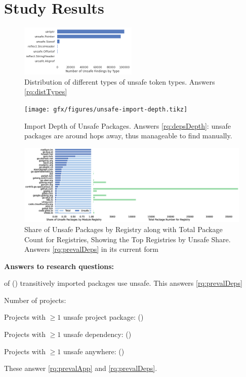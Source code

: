 \section{Study Results}
\label{sec:eval}

\begin{figure}[ht]
    \centering
    \includegraphics[width=0.5\textwidth]{gfx/figures/distribution-unsafe-types.png}
    \caption{Distribution of different types of unsafe token types. Answers \ref{rq:distTypes}}
    \label{fig:unsafe-tokens-distribution}
\end{figure}

\begin{figure}[ht]
    \centering
    {\scriptsize \texttt{[image: gfx/figures/unsafe-import-depth.tikz]}}
    \caption{Import Depth of Unsafe Packages. Answers \ref{rq:depsDepth}: unsafe packages are around  hops away, thus manageable to find manually. }
    \label{fig:unsafe-import-depth}
\end{figure}

\begin{figure}[ht]
    \centering
    \includegraphics[width=\textwidth]{gfx/figures/unsafe-packages-by-registry-n30.eps}
    \caption{Share of Unsafe Packages by Registry along with Total Package Count for Registries, Showing the Top  Registries by Unsafe Share. Answers \ref{rq:prevalDeps} in its current form}
    \label{fig:unsafe-by-registry}
\end{figure}







\textbf{Answers to research questions:}

 of  () transitively imported packages use unsafe. This answers \ref{rq:prevalDeps}

Number of projects: 

Projects with $\geq 1$ unsafe project package:  ()

Projects with $\geq 1$ unsafe dependency:  ()

Projects with $\geq 1$ unsafe anywhere:  ()

These answer \ref{rq:prevalApp} and \ref{rq:prevalDeps}.
